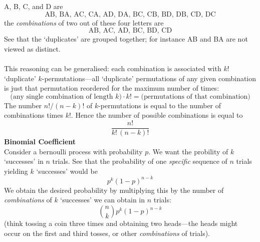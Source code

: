 \documentclass{report}
\begin{document}
A, B, C, and D are
\begin{equation*}
\text{AB, BA, AC, CA, AD, DA, BC, CB, BD, DB, CD, DC}
\end{equation*}
the \textit{combinations} of two out of these four letters are
\begin{equation*}
\text{AB, AC, AD, BC, BD, CD}
\end{equation*}
See that the `duplicates' are grouped together; for instance AB and BA are not viewed as distinct.\\
\vspace{1mm}\\
This reasoning can be generalised: each combination is associated with $k!$ `duplicate' $k$-permutations---all
`duplicate' permutations of any given combination is just
that permutation reordered for the maximum number of times:
\begin{equation*}
\text{(any single combination of length $k$)}\cdot k!=\text{(permutations of that combination)}
\end{equation*}
The number $n!/(n-k)!$ of $k$-permutations is equal to the number of combinations times $k!$. Hence the number of
possible combinations is equal to
\begin{equation*}
\frac{n!}{k!\,(n-k)!}
\end{equation*}
\textbf{Binomial Coefficient}\\
Consider a bernoulli process with probability $p$. We want the probility of $k$ `successes' in $n$ trials. 
See that the probability of one \textit{specific} sequence of $n$ trials yielding $k$ `successes' would be
\begin{equation*}
p^k(1-p)^{n-k}
\end{equation*}
We obtain the desired probability by multiplying this by the number of \textit{combinations} of $k$ `successes' we
can obtain in $n$ trials: 
\begin{equation*}
\binom{n}{k}p^k(1-p)^{n-k}
\end{equation*}
(think tossing a coin three times and obtaining two heads---the heads might occur on 
the first and third tosses, or other \textit{combinations} of trials).
\newpage
\end{document}
